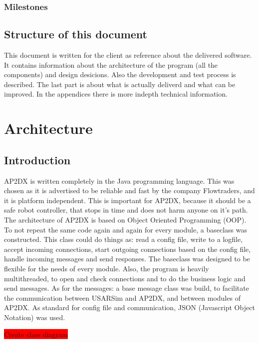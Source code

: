 \documentclass[titlepage, a4paper,10pt]{article}
\newcommand{\todo}[1]{\colorbox{red}{\color{white}#1}}
\begin{document}
\subsubsection{Milestones}

\subsection{Structure of this document}
This document is written for the client as reference about the delivered software. It contains information about the architecture of the program (all the components) and design desicions. Also the development and test process is described. The last part is about what is actually deliverd and what can be improved. In the appendices there is more indepth technical information.

\newpage

\section{Architecture}
\subsection{Introduction}
AP2DX is written completely in the Java programming language. 
This was chosen as it is advertised to be reliable and fast by the company Flowtraders, and it is platform independent. This is important for AP2DX, because it should be a safe robot controller, that stops in time and does not harm anyone on it's path. The architecture of AP2DX is based on Object Oriented Programming (OOP).
To not repeat the same code again and again for every module, a baseclass was constructed. 
This class could do things as: read a config file, write to a logfile, accept incoming connections, start outgoing connections based on the config file, handle incoming messages and send responses.
The baseclass was designed to be flexible for the needs of every module. Also, the program is heavily multithreaded, to open and check connections and to do the business logic and send messages. As for the messages: a base message class was build, to facilitate the communication between USARSim and AP2DX, and between modules of AP2DX. As standard for config file and communication, JSON (Javascript Object Notation) was used. 

\todo{Create class diagram}
\end{document}
